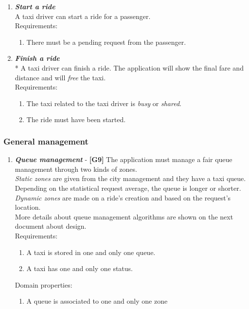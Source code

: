 \documentclass{article}
\begin{document}
\begin{enumerate}
\item \textit{\textbf{Start a ride}}\\
A taxi driver can start a ride for a passenger.\\
Requirements:
\begin{enumerate}
\item There must be a pending request from the passenger.
\end{enumerate}

\item \textit{\textbf{Finish a ride}}\\*
A taxi driver can finish a ride. The application will show the final fare and distance and will \textit{free} the taxi.\\
Requirements:
\begin{enumerate}
\item The taxi related to the taxi driver is \textit{busy} or \textit{shared}.
\item The ride must have been started.
\end{enumerate}

\end{enumerate}

\subsubsection{General management}
\begin{enumerate}
\item \textit{\textbf{Queue management}} - \textbf{[G9]}
The application must manage a fair queue management through two kinds
of zones.\\
\textit{Static zones} are given from the city management and they have a taxi queue. Depending on the statistical request average, the queue is longer or shorter.\\
\textit{Dynamic zones} are made on a ride’s creation and based on the request’s location.\\
More details about queue management algorithms are shown on the next
document about design.\\
Requirements:
\begin{enumerate}
\item A taxi is stored in one and only one queue.
\item A taxi has one and only one status.
\end{enumerate}
Domain properties:
\begin{enumerate}
\item A queue is associated to one and only one zone
\end{enumerate}
\end{enumerate}
\end{document}

